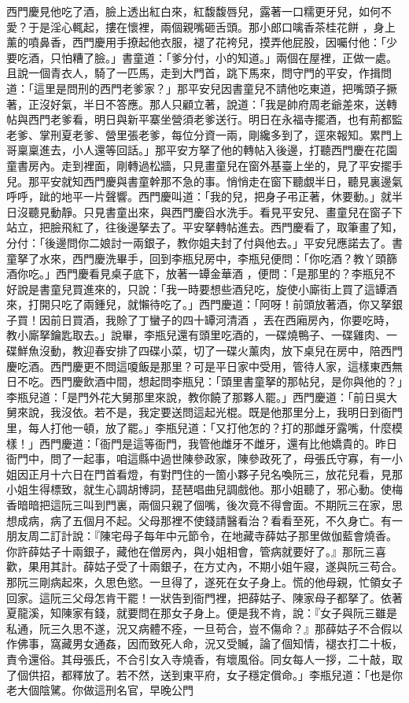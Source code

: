 西門慶見他吃了酒，臉上透出紅白來，紅馥馥唇兒，露著一口糯更牙兒，如何不愛？于是淫心輒起，摟在懷裡，兩個親嘴砸舌頭。那小郎口噙香茶桂花餅 ，身上薰的噴鼻香，西門慶用手撩起他衣服，褪了花袴兒，摸弄他屁股，因囑付他：「少要吃酒，只怕糟了臉。」書童道：「爹分付，小的知道。」兩個在屋裡，正做一處。且說一個青衣人，騎了一匹馬，走到大門首，跳下馬來，問守門的平安，作揖問道：「這里是問刑的西門老爹家？」那平安兒因書童兒不請他吃東道，把嘴頭子撅著，正沒好氣，半日不答應。那人只顧立著，說道：「我是帥府周老爺差來，送轉帖與西門老爹看，明日與新平寨坐營須老爹送行。明日在永福寺擺酒，也有荊都監老爹、掌刑夏老爹、營里張老爹，每位分資一兩，剛纔多到了，逕來報知。累門上哥稟稟進去，小人還等回話。」那平安方拏了他的轉帖入後邊，打聽西門慶在花園童書房內。走到裡面，剛轉過松牆，只見畫童兒在窗外基臺上坐的，見了平安擺手兒。那平安就知西門慶與書童幹那不急的事。悄悄走在窗下聽覷半日，聽見裏邊氣呼呼，跐的地平一片聲響。西門慶叫道：「我的兒，把身子弔正著，休要動。」就半日沒聽見動靜。只見書童出來，與西門慶舀水洗手。看見平安兒、畫童兒在窗子下站立，把臉飛紅了，往後邊拏去了。平安拏轉帖進去。西門慶看了，取筆畫了知，分付：「後邊問你二娘討一兩銀子，教你姐夫封了付與他去。」平安兒應諾去了。書童拏了水來，西門慶洗畢手，回到李瓶兒房中，李瓶兒便問：「你吃酒？教丫頭篩酒你吃。」西門慶看見桌子底下，放著一罈金華酒 ，便問：「是那里的？李瓶兒不好說是書童兒買進來的，只說：「我一時要想些酒兒吃，旋使小廝街上買了這罈酒來，打開只吃了兩鍾兒，就懶待吃了。」西門慶道：「阿呀！前頭放著酒，你又拏銀子買！因前日買酒，我賒了丁蠻子的四十罈河清酒 ，丟在西廂房內，你要吃時，教小廝拏鑰匙取去。」說畢，李瓶兒還有頭里吃酒的，一碟燒鴨子、一碟雞肉、一碟鮮魚沒動，教迎春安排了四碟小菜，切了一碟火薰肉，放下桌兒在房中，陪西門慶吃酒。西門慶更不問這嗄飯是那里？可是平日家中受用，管待人家，這樣東西無日不吃。西門慶飲酒中間，想起問李瓶兒：「頭里書童拏的那帖兒，是你與他的？」李瓶兒道：「是門外花大舅那里來說，教你饒了那夥人罷。」西門慶道：「前日吳大舅來說，我沒依。若不是，我定要送問這起光棍。既是他那里分上，我明日到衙門里，每人打他一頓，放了罷。」李瓶兒道：「又打他怎的？打的那雌牙露嘴，什麼模樣！」西門慶道：「衙門是這等衙門，我管他雌牙不雌牙，還有比他嬌貴的。昨日衙門中，問了一起事，咱這縣中過世陳參政家，陳參政死了，母張氏守寡，有一小姐因正月十六日在門首看燈，有對門住的一箇小夥子兒名喚阮三，放花兒看，見那小姐生得標致，就生心調胡博詞，琵琶唱曲兒調戲他。那小姐聽了，邪心動。使梅香暗暗把這阮三叫到門裏，兩個只親了個嘴，後次竟不得會面。不期阮三在家，思想成病，病了五個月不起。父母那裡不使錢請醫看治？看看至死，不久身亡。有一朋友周二訂計說：『陳宅母子每年中元節令，在地藏寺薛姑子那里做伽藍會燒香。你許薛姑子十兩銀子，藏他在僧房內，與小姐相會，管病就要好了。』那阮三喜歡，果用其計。薛姑子受了十兩銀子，在方丈內，不期小姐午寢，遂與阮三苟合。那阮三剛病起來，久思色慾。一旦得了，遂死在女子身上。慌的他母親，忙領女子回家。這阮三父母怎肯干罷！一狀告到衙門裡，把薛姑子、陳家母子都拏了。依著夏龍溪，知陳家有錢，就要問在那女子身上。便是我不肯，說：『女子與阮三雖是私通，阮三久思不遂，況又病體不痊，一旦苟合，豈不傷命？』那薛姑子不合假以作佛事，窩藏男女通姦，因而致死人命，況又受贓，論了個知情，褪衣打二十板，責令還俗。其母張氏，不合引女入寺燒香，有壞風俗。同女每人一拶，二十敲，取了個供招，都釋放了。若不然，送到東平府，女子穩定償命。」李瓶兒道：「也是你老大個陰騭。你做這刑名官，早晚公門
